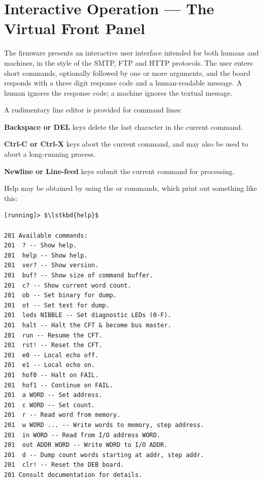 \section{Interactive Operation — The Virtual Front Panel}

The firmware presents an interactive user interface intended for both
humans and machines, in the style of the SMTP, FTP and HTTP
protocols. The user enters short commands, optionally followed by one
or more arguments, and the board responds with a three digit response
code and a human-readable message. A human ignores the response code;
a machine ignores the textual message.

A rudimentary line editor is provided for command lines:

\begin{description}
\item{\bfseries Backspace or DEL} keys delete the last character in the
  current command.
\item{\bfseries Ctrl-C or Ctrl-X} keys abort the current command, and may
  also be used to abort a long-running process.
\item{\bfseries Newline or Line-feed} keys submit the current command for
  processing.
\end{description}

Help may be obtained by using the  or  commands,
which print out something like this:

{\small
\begin{lstlisting}[style=deb]
[running]> $\lstkbd{help}$

201 Available commands:
201  ? -- Show help.
201  help -- Show help.
201  ver? -- Show version.
201  buf? -- Show size of command buffer.
201  c? -- Show current word count.
201  ob -- Set binary for dump.
201  ot -- Set text for dump.
201  leds NIBBLE -- Set diagnostic LEDs (0-F).
201  halt -- Halt the CFT & become bus master.
201  run -- Resume the CFT.
201  rst! -- Reset the CFT.
201  e0 -- Local echo off.
201  e1 -- Local echo on.
201  hof0 -- Halt on FAIL.
201  hof1 -- Continue on FAIL.
201  a WORD -- Set address.
201  c WORD -- Set count.
201  r -- Read word from memory.
201  w WORD ... -- Write words to memory, step address.
201  in WORD -- Read from I/O address WORD.
201  out ADDR WORD -- Write WORD to I/O ADDR.
201  d -- Dump count words starting at addr, step addr.
201  clr! -- Reset the DEB board.
201 Consult documentation for details.
\end{lstlisting}
}

